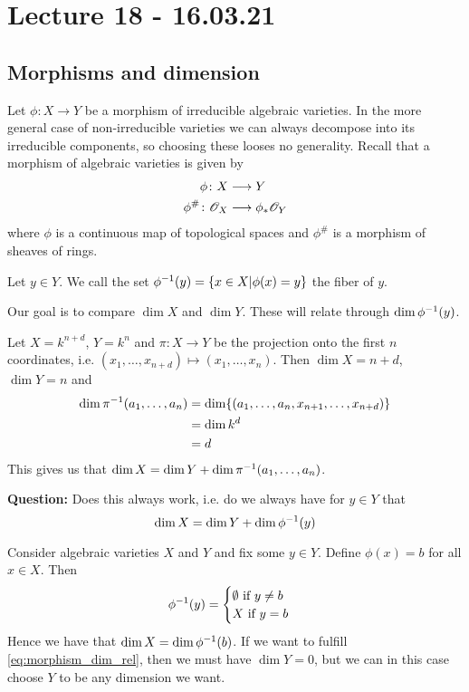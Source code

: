 

\section{Lecture 18 - 16.03.21}

\subsection{Morphisms and dimension}

Let $\phi\colon X\longrightarrow Y$ be a morphism of irreducible algebraic varieties. In the more general case of non-irreducible varieties we can always decompose into its irreducible components, so choosing these looses no generality. Recall that a morphism of algebraic varieties is given by 
\begin{align*}
    \phi\colon X &\longrightarrow Y \\
    \phi^\# \colon \mathscr{O}_X &\longrightarrow \phi_*\mathscr{O}_Y
\end{align*}
where $\phi$ is a continuous map of topological spaces and $\phi^\#$ is a morphism of sheaves of rings. 

Let $y\in Y$. We call the set $\phi^{-1}(y)=\{ x\in X \vert \phi(x)=y \}$ the fiber of $y$. 

Our goal is to compare $\dim X$ and $\dim Y$. These will relate through $\dim \phi^{-1}(y)$. 

\begin{example}
Let $X=k^{n+d}$, $Y=k^n$ and $\pi\colon X\longrightarrow Y$ be the projection onto the first $n$ coordinates, i.e. $(x_1, \ldots, x_{n+d})\mapsto (x_1,\ldots, x_n)$. Then $\dim X = n+d$, $\dim Y = n$ and
\begin{align*}
    \dim \pi^{-1}(a_1, \ldots, a_n) 
    &= \dim \{ (a_1, \ldots, a_n, x_{n+1}, \ldots, x_{n+d}) \} \\
    &= \dim k^d \\
    &= d
\end{align*}
This gives us that $\dim X = \dim Y + \dim \pi^{-1}(a_1, \ldots, a_n)$. 
\end{example}

\textbf{Question:} Does this always work, i.e. do we always have for $y\in Y$ that
\begin{equation}
\label{eq:morphism_dim_rel}
    \dim X = \dim Y + \dim \phi^{-1}(y)
\end{equation}

\begin{example}[Counterexample]
Consider algebraic varieties $X$ and $Y$ and fix some $y\in Y$. Define $\phi(x)=b$ for all $x\in X$. Then 
\begin{equation*}
\phi^{-1}(y) = 
\begin{cases}
\emptyset \text{ if } y\neq b \\
X \text{ if } y=b
\end{cases}    
\end{equation*}
Hence we have that $\dim X = \dim\phi^{-1}(b)$. If we want to fulfill \cref{eq:morphism_dim_rel}, then we must have $\dim Y = 0$, but we can in this case choose $Y$ to be any dimension we want. 
\end{example}

